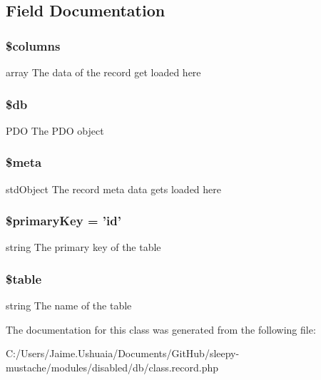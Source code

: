 \subsection{Field Documentation}
\hypertarget{class_record_a19d2a3d21fe02053311fde465e6ae2e9}{
\subsubsection[{\$columns}]{\setlength{\rightskip}{0pt plus 5cm}\$columns}}\label{class_record_a19d2a3d21fe02053311fde465e6ae2e9}
array The data of the record get loaded here \hypertarget{class_record_a1fa3127fc82f96b1436d871ef02be319}{
\subsubsection[{\$db}]{\setlength{\rightskip}{0pt plus 5cm}\$db\hspace{0.3cm}{\ttfamily [protected]}}}\label{class_record_a1fa3127fc82f96b1436d871ef02be319}
P\-D\-O The P\-D\-O object \hypertarget{class_record_a9e6fc1ae0498be7d1e682f8bcc9299df}{
\subsubsection[{\$meta}]{\setlength{\rightskip}{0pt plus 5cm}\$meta}}\label{class_record_a9e6fc1ae0498be7d1e682f8bcc9299df}
std\-Object The record meta data gets loaded here \hypertarget{class_record_a927b0256b942a3ee89485f2649af7981}{
\subsubsection[{\$primary\-Key}]{\setlength{\rightskip}{0pt plus 5cm}\$primary\-Key = 'id'\hspace{0.3cm}{\ttfamily [protected]}}}\label{class_record_a927b0256b942a3ee89485f2649af7981}
string The primary key of the table \hypertarget{class_record_ae8876a14058f368335baccf35af4a22b}{
\subsubsection[{\$table}]{\setlength{\rightskip}{0pt plus 5cm}\$table\hspace{0.3cm}{\ttfamily [protected]}}}\label{class_record_ae8876a14058f368335baccf35af4a22b}
string The name of the table 

The documentation for this class was generated from the following file\-:\begin{DoxyCompactItemize}
\item 
C\-:/\-Users/\-Jaime.\-Ushuaia/\-Documents/\-Git\-Hub/sleepy-\/mustache/modules/disabled/db/class.\-record.\-php\end{DoxyCompactItemize}
